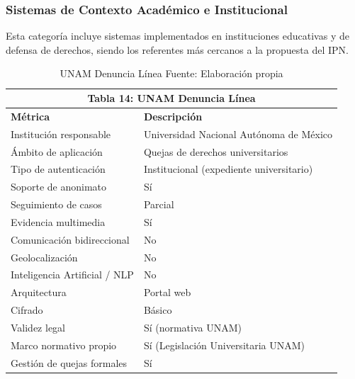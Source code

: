 
\subsubsection{Sistemas de Contexto Académico e Institucional}

\begin{flushleft}
\justifying
Esta categoría incluye sistemas implementados en instituciones educativas y de defensa de derechos, siendo los referentes más cercanos a la propuesta del IPN.
\end{flushleft}

\begin{table}[htbp]
\centering
\small
\begin{tabular}{|l|l|}
\hline \multicolumn{2}{|c|}{\textbf{Tabla 14: UNAM Denuncia Línea}} \\
\hline \textbf{Métrica} & \textbf{Descripción} \\
\hline Institución responsable & Universidad Nacional Autónoma de México \\
\hline Ámbito de aplicación & Quejas de derechos universitarios \\
\hline Tipo de autenticación & Institucional (expediente universitario) \\
\hline Soporte de anonimato & Sí \\
\hline Seguimiento de casos & Parcial \\
\hline Evidencia multimedia & Sí \\
\hline Comunicación bidireccional & No \\
\hline Geolocalización & No \\
\hline Inteligencia Artificial / NLP & No \\
\hline Arquitectura & Portal web \\
\hline Cifrado & Básico \\
\hline Validez legal & Sí (normativa UNAM) \\
\hline Marco normativo propio & Sí (Legislación Universitaria UNAM) \\
\hline Gestión de quejas formales & Sí \\
\hline \end{tabular}
\caption{UNAM Denuncia Línea \label{tab:unam} \footnotesize Fuente: Elaboración propia \cite{24}} 
\end{table}


